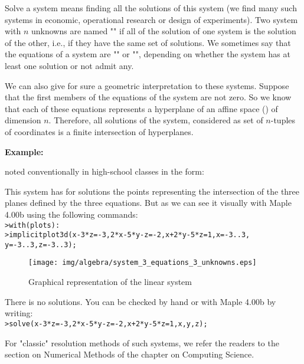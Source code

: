 Solve a system means finding all the solutions of this system (we find many such systems in economic, operational research or design of experiments). Two system with $n$ unknowns are named  "" if all of the solution of one system is the solution of the other, i.e., if they have the same set of solutions. We sometimes say that the equations of a system are "" or "", depending on whether the system has at least one solution or not admit any.

We can also give for sure a geometric interpretation to these systems. Suppose that the first members of the equations of the system are not zero. So we know that each of these equations represents a hyperplane of an affine space () of dimension $n$. Therefore, all solutions of the system, considered as set of $n$-tuples of coordinates is a finite intersection of hyperplanes.

	\begin{tcolorbox}[colframe=black,colback=white,sharp corners]
	\textbf{{\Large {}}Example:}
	
	noted conventionally in high-school classes in the form:
	
	This system has for solutions the points representing the intersection of the three planes defined by the three equations. But as we can see it visually with Maple 4.00b using the following commands:\\

	\texttt{>with(plots):}\\
	\texttt{>implicitplot3d({x-3*z=-3,2*x-5*y-z=-2,x+2*y-5*z=1},x=-3..3,}
	\texttt{y=-3..3,z=-3..3);}
	
	\begin{figure}[H]
	\centering
	\texttt{[image: img/algebra/system\_3\_equations\_3\_unknowns.eps]}
	\caption{Graphical representation of the linear system}
	\end{figure}
	
	There is no solutions. You can be checked by hand or with Maple 4.00b by writing:\\
	
	\texttt{>solve({x-3*z=-3,2*x-5*y-z=-2,x+2*y-5*z=1},{x,y,z});}
	\end{tcolorbox}

	\begin{tcolorbox}[title=Remark,colframe=black,arc=10pt]
For "classic" resolution methods of such systems, we refer the readers to the section on Numerical Methods of the chapter on Computing Science.
	\end{tcolorbox}	
	
